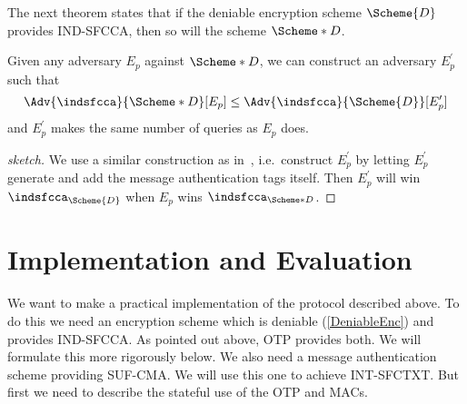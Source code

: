 The next theorem states that if the deniable encryption scheme \(\Scheme{D}\) 
provides \ac{IND-SFCCA}, then so will the scheme \(\Scheme*{D}\).

\begin{theorem}
  Given any adversary \(E_p\) against \(\Scheme*{D}\), we can construct an 
  adversary \(E_p^\prime\) such that
  \begin{equation}
    \Adv{\indsfcca}{\Scheme*{D}}[E_p]
      \leq \Adv{\indsfcca}{\Scheme{D}}[E_p^\prime]
  \end{equation}
  and \(E_p^\prime\) makes the same number of queries as \(E_p\) does.
\end{theorem}
\begin{proof}[sketch]
  We use a similar construction as in~\cite{AuthEncryption,StatefulDecryption}, 
  i.e.\ construct \(E_p^\prime\) by letting \(E_p^\prime\) generate and add the 
  message authentication tags itself.
  Then \(E_p^\prime\) will win \(\indsfcca_{\Scheme{D}}\) when \(E_p\) wins 
  \(\indsfcca_{\Scheme*{D}}\).
\end{proof}


\section{Implementation and Evaluation}
\label{Implementation}

We want to make a practical implementation of the protocol described above.
To do this we need an encryption scheme which is deniable (\cref{DeniableEnc}) 
and provides \ac{IND-SFCCA}.
As pointed out above, \ac{OTP} provides both.
We will formulate this more rigorously below.
We also need a message authentication scheme providing \ac{SUF-CMA}.
We will use this one to achieve \ac{INT-SFCTXT}.
But first we need to describe the stateful use of the \ac{OTP} and \acp{MAC}.

